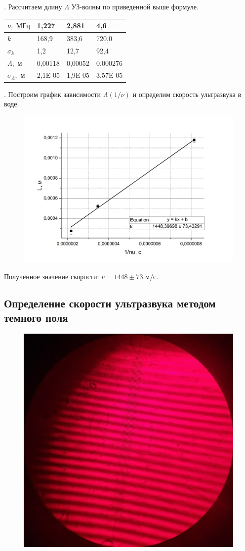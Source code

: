 \documentclass[a4paper,12pt]{article} %
\begin{document}
. Рассчитаем длину $\Lambda$ УЗ-волны по приведенной выше формуле.

\begin{table}[!h]
\begin{tabular}{|l|l|l|l|}
\hline
$\nu, \text{ МГц}$    & 1,227   & 2,881   & 4,6      \\ \hline
$k$                   & 168,9   & 383,6   & 720,0    \\ \hline
$\sigma_k$            & 1,2     & 12,7    & 92,4     \\ \hline
$\Lambda,    \text{ м}$     & 0,00118 & 0,00052 & 0,000276 \\ \hline
$\sigma_\Lambda, \text{ м}$ & 2,1E-05 & 1,9E-05 & 3,57E-05 \\ \hline
\end{tabular}
\end{table}

. Построим график зависимости $\Lambda(1/\nu)$ и определим скорость  ультразвука в воде.

\newpage

\begin{figure}[!h]
 	\centering 	\includegraphics[width=0.8\linewidth]{дифр_2.png}
 \end{figure}
 
\noindent Полученное значение скорости: $v = 1448 \pm 73 \text{ м/с}$.


\subsection{Определение скорости ультразвука методом темного поля}

\begin{figure}[h!]
 	\centering 	\includegraphics[width=0.4\linewidth]{поле.png}
 \end{figure}
\end{document}
